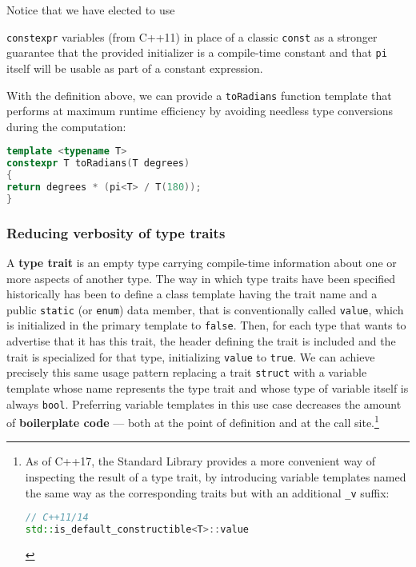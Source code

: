 \noindent Notice that we have elected to use {\texttt{constexpr} variables
(from C++11) in place of a classic \texttt{const} as a stronger
guarantee that the provided initializer is a compile-time constant and
that \texttt{pi} itself will be usable as part of a constant expression.

With the definition above, we can provide a
\texttt{toRadians} function template that performs at maximum runtime
efficiency by avoiding needless type conversions during the computation:

\begin{lstlisting}[language=C++]
template <typename T>
constexpr T toRadians(T degrees)
{
return degrees * (pi<T> / T(180));
}
\end{lstlisting}


\subsubsection[Reducing verbosity of type traits]{Reducing verbosity of type traits}\label{reducing-verbosity-of-type-traits}

A \textbf{type trait} is an empty type carrying compile-time information
about one or more aspects of another type. The way in which type traits
have been specified historically has been to define a class template
having the trait name and a public \texttt{static} (or \texttt{enum})
data member, that is conventionally called \texttt{value}, which is
initialized in the primary template to \texttt{false}. Then, for each
type that wants to advertise that it has this trait, the header defining
the trait is included and the trait is specialized for that type,
initializing \texttt{value} to \texttt{true}. We can achieve precisely
this same usage pattern replacing a trait \texttt{struct} with a
variable template whose name represents the type trait and whose type of
variable itself is always \texttt{bool}. Preferring variable templates
in this use case decreases the amount of \textbf{boilerplate code} ---
both at the point of definition and at the call
site.{\cprotect\footnote{As of C++17, the Standard Library provides a
more convenient way of inspecting the result of a type trait, by
introducing variable templates named the same way as the corresponding
traits but with an additional \texttt{\_v} suffix:

\begin{lstlisting}[language=C++, basicstyle={\ttfamily\footnotesize}]
// C++11/14
std::is_default_constructible<T>::value


\end{lstlisting}}}}
